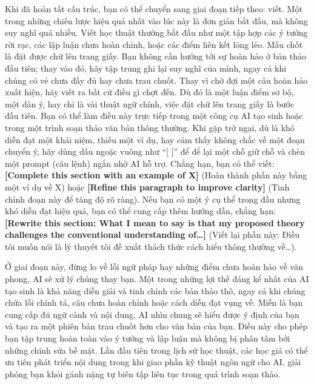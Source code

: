 Khi đã hoàn tất cấu trúc, bạn có thể chuyển sang giai đoạn tiếp theo: viết. Một trong những chiến lược hiệu quả nhất vào lúc này là đơn giản bắt đầu, mà không suy nghĩ quá nhiều. Viết học thuật thường bắt đầu như một tập hợp các ý tưởng rời rạc, các lập luận chưa hoàn chỉnh, hoặc các điểm liên kết lỏng lẻo. Mấu chốt là đặt được chữ lên trang giấy. Bạn không cần hướng tới sự hoàn hảo ở bản thảo đầu tiên; thay vào đó, hãy tập trung ghi lại suy nghĩ của mình, ngay cả khi chúng có vẻ chưa đầy đủ hay chưa trau chuốt. Thay vì chờ đợi một câu hoàn hảo xuất hiện, hãy viết ra bất cứ điều gì chợt đến. Dù đó là một luận điểm sơ bộ, một dàn ý, hay chỉ là vài thuật ngữ chính, việc đặt chữ lên trang giấy là bước đầu tiên. Bạn có thể làm điều này trực tiếp trong một công cụ AI tạo sinh hoặc trong một trình soạn thảo văn bản thông thường. Khi gặp trở ngại, dù là khó diễn đạt một khái niệm, thiếu một ví dụ, hay cảm thấy không chắc về một đoạn chuyển ý, hãy dùng dấu ngoặc vuông như ``{[} {]}'' để để lại một chỗ giữ chỗ và chèn một prompt (câu lệnh) ngắn nhờ AI hỗ trợ. Chẳng hạn, bạn có thể viết: \textbf{{[}Complete this section with an example of X{]}} (Hoàn thành phần này bằng một ví dụ về X) hoặc \textbf{{[}Refine this paragraph to improve clarity{]}} (Tinh chỉnh đoạn này để tăng độ rõ ràng). Nếu bạn có một ý cụ thể trong đầu nhưng khó diễn đạt hiệu quả, bạn có thể cung cấp thêm hướng dẫn, chẳng hạn: \textbf{{[}Rewrite this section: What I mean to say is that my proposed theory challenges the conventional understanding of\ldots{]}} (Viết lại phần này: Điều tôi muốn nói là lý thuyết tôi đề xuất thách thức cách hiểu thông thường về\ldots).

Ở giai đoạn này, đừng lo về lỗi ngữ pháp hay những điểm chưa hoàn hảo về văn phong, AI sẽ xử lý chúng thay bạn. Một trong những lợi thế đáng kể nhất của AI tạo sinh là khả năng diễn giải và tinh chỉnh các bản thảo thô, ngay cả khi chúng chứa lỗi chính tả, câu chưa hoàn chỉnh hoặc cách diễn đạt vụng về. Miễn là bạn cung cấp đủ ngữ cảnh và nội dung, AI nhìn chung sẽ hiểu được ý định của bạn và tạo ra một phiên bản trau chuốt hơn cho văn bản của bạn. Điều này cho phép bạn tập trung hoàn toàn vào ý tưởng và lập luận mà không bị phân tâm bởi những chỉnh sửa bề mặt. Lần đầu tiên trong lịch sử học thuật, các học giả có thể ưu tiên phát triển nội dung trong khi giao phần kỹ thuật ngôn ngữ cho AI, giải phóng bạn khỏi gánh nặng tự biên tập liên tục trong quá trình soạn thảo.

